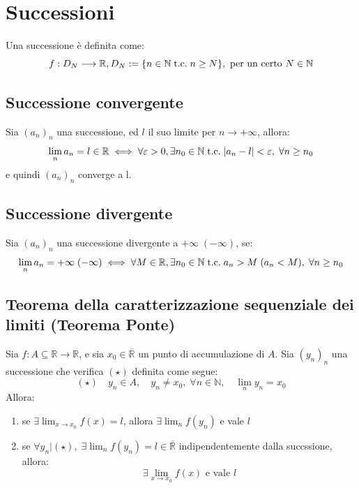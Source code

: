 \documentclass[a4paper,12pt,openright]{book}
\begin{document}
	\newpage
	
	\chapter{Successioni}
	
	Una successione è definita come:
	\[f: D_N \longrightarrow \mathbb{R}, D_N := \{n \in \mathbb{N} \;\text{t.c.}\; n \geq N\}, \text{ per un certo } N \in \mathbb{N}\]
	
	\section{Successione convergente}
	Sia $(a_n)_n$ una successione, ed $l$ il suo limite per $n \rightarrow +\infty$, allora:
	\[\lim_{n} a_n = l \in \mathbb{R} \iff \forall \varepsilon > 0, \exists n_0 \in \mathbb{N} \;\text{t.c.}\; |a_n - l| < \varepsilon, \; \forall n \geq n_0\]
	e quindi $(a_n)_n$ converge a l.
	
	\section{Successione divergente}
	Sia $(a_n)_n$ una successione divergente a $+ \infty \; (- \infty)$, se:
	\[\lim_{n} a_n = + \infty \; (- \infty) \iff \forall M \in \mathbb{R}, \exists n_0 \in \mathbb{N} \;\text{t.c.}\; a_n > M \; (a_n < M), \; \forall n \geq n_0\]
	
	\newpage
	
	\section{Teorema della caratterizzazione sequenziale dei limiti (Teorema Ponte)}
	Sia $f: A \subseteq \mathbb{R} \longrightarrow \mathbb{R}$, e sia $x_0 \in \overline{\mathbb{R}}$ un punto di accumulazione di $A$. Sia $(y_n)_n$ una successione che verifica $(\star)$ definita come segue:
	\[(\star) \quad y_n \in A, \quad y_n \not = x_0, \; \forall n \in \mathbb{N}, \quad \lim_{n} y_n = x_0\]
	Allora:
	\begin{enumerate}[label=\alph*)]
		\item se $\exists \lim_{x \rightarrow x_0} f(x) = l$, allora $\exists \lim_{n} f(y_n)$ e vale $l$
		\item se $\displaystyle \forall y_n | (\star), \; \exists \lim_{n} f(y_n) = l \in \overline{\mathbb{R}}$ indipendentemente dalla succssione, allora:
		\[\exists \lim_{x \rightarrow x_0} f(x) \text{ e vale } l\]
	\end{enumerate}
	
\end{document}
